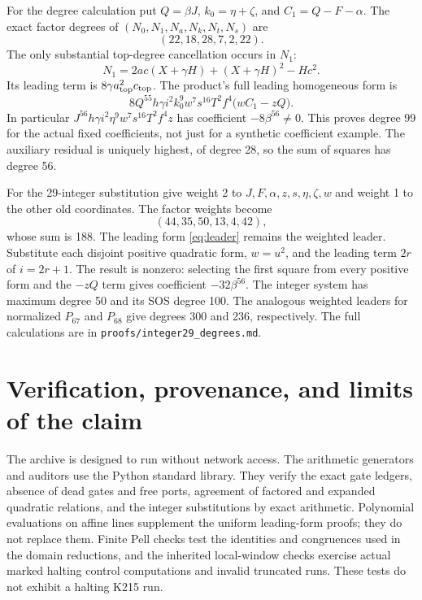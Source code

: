 \documentclass[11pt,a4paper]{article}
\theoremstyle{remark}\newtheorem{remark}[theorem]{Remark}
\newcommand{\src}[1]{\nolinkurl{#1}}
\begin{document}
For the degree calculation put $Q=\beta J$, $k_0=\eta+\zeta$,
and $C_1=Q-F-\alpha$. The exact factor degrees of
$(N_0,N_1,N_a,N_k,N_t,N_s)$ are
\[
 (22,18,28,7,2,22).
\]
The only substantial top-degree cancellation occurs in $N_1$:
\[
 N_1=2ac(X+\gamma H)+(X+\gamma H)^2-Hc^2.
\]
Its leading term is $8\gamma a_{\rm top}^2c_{\rm top}$.
The product's full leading homogeneous form is
\begin{equation}
 8Q^{55}h\gamma i^2k_0^9w^7s^{16}T^2f^4
       \bigl(wC_1-zQ\bigr).
 \label{eq:leader}
\end{equation}
In particular
$J^{56}h\gamma i^2\eta^9w^7s^{16}T^2f^4z$
has coefficient $-8\beta^{56}\ne0$.
This proves degree 99 for the actual fixed coefficients, not just
for a synthetic coefficient example. The auxiliary residual is
uniquely highest, of degree 28, so the sum of squares has degree 56.

For the 29-integer substitution give weight 2 to
$J,F,\alpha,z,s,\eta,\zeta,w$ and weight 1 to the other old
coordinates. The factor weights become
\[
 (44,35,50,13,4,42),
\]
whose sum is 188. The leading form \eqref{eq:leader} remains the
weighted leader. Substitute each disjoint positive quadratic form,
$w=u^2$, and the leading term $2r$ of $i=2r+1$.
The result is nonzero: selecting the first square from every positive
form and the $-zQ$ term gives coefficient $-32\beta^{56}$.
The integer system has maximum degree 50 and its SOS degree 100.
The analogous weighted leaders for normalized $P_{67}$ and $P_{68}$
give degrees 300 and 236, respectively. The full calculations are in
\src{proofs/integer29_degrees.md}.

\section{Verification, provenance, and limits of the claim}
The archive is designed to run without network access. The arithmetic
generators and auditors use the Python standard library. They verify
the exact gate ledgers, absence of dead gates and free ports,
agreement of factored and expanded quadratic relations, and the
integer substitutions by exact arithmetic. Polynomial evaluations on
affine lines supplement the uniform leading-form proofs; they do not
replace them. Finite Pell checks test the identities and congruences
used in the domain reductions, and the inherited local-window checks
exercise actual marked halting control computations and invalid
truncated runs. These tests do not exhibit a halting K215 run.
\end{document}
